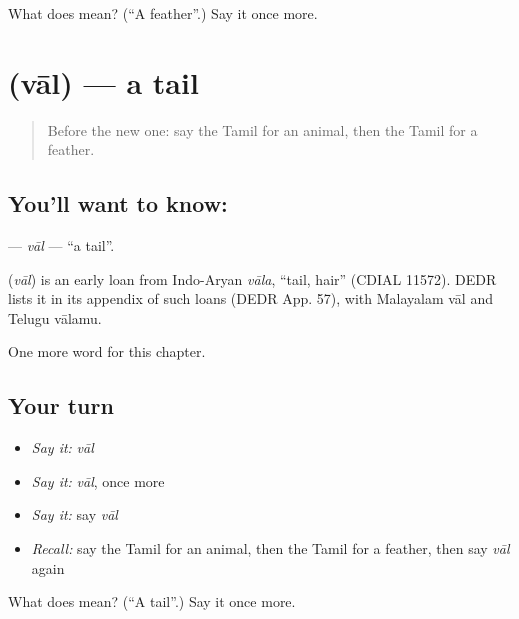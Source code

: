 \begin{tcolorbox}[breakable,colback=teal!4,colframe=teal!35!black,title={Before you move on}]
What does  mean? (\textquotedblleft{}A feather\textquotedblright{}.) Say it once more.
\end{tcolorbox}
\section[\texorpdfstring{\ta{வால்} (vāl)}{வால் (vāl)}]{ (vāl) — a tail}

\label{lesson:TA-C275-val}



\begin{quote}
Before the new one: say the Tamil for an animal, then the Tamil for a feather.
\end{quote}

\subsection*{You'll want to know: }
\textbf{} — \emph{vāl} — \textquotedblleft{}a tail\textquotedblright{}.

\begin{cousinweb}
\textbf{} (\emph{vāl}) is an early loan from Indo-Aryan \emph{vāla}, \textquotedblleft{}tail, hair\textquotedblright{} (CDIAL 11572). DEDR lists it in its appendix of such loans (DEDR App. 57), with Malayalam vāl and Telugu vālamu.
\end{cousinweb}

\begin{grammarlens}[title={What you've built}]
One more word for this chapter.
\end{grammarlens}

\subsection*{Your turn}
\begin{itemize}
\raggedright
  \item \emph{Say it:} \emph{vāl}
  \item \emph{Say it:} \emph{vāl}, once more
  \item \emph{Say it:} say \emph{vāl}
  \item \emph{Recall:} say the Tamil for an animal, then the Tamil for a feather, then say \emph{vāl} again
\end{itemize}

\begin{tcolorbox}[breakable,colback=teal!4,colframe=teal!35!black,title={Before you move on}]
What does  mean? (\textquotedblleft{}A tail\textquotedblright{}.) Say it once more.
\end{tcolorbox}
